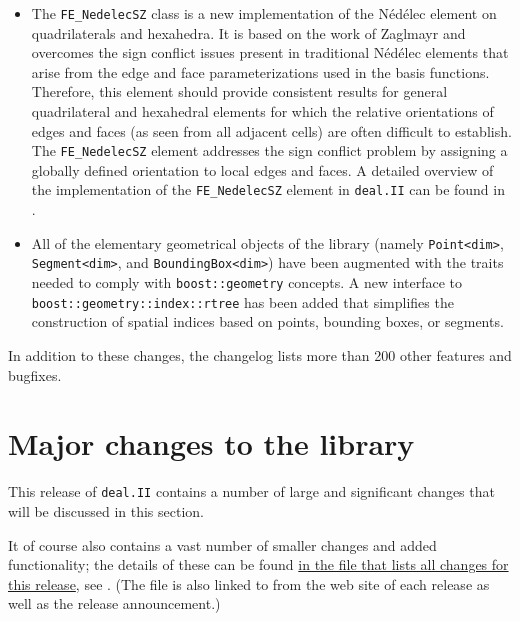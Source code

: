 \documentclass{ansarticle-preprint}
\newcommand{\specialword}[1]{\texttt{#1}}
\newcommand{\dealii}{{\specialword{deal.II}}\xspace}
\begin{document}
\begin{itemize}
\item
  The \texttt{FE\_NedelecSZ} class is a new implementation of the
  N{\'e}d{\'e}lec element on quadrilaterals and hexahedra. It is based on
  the work of Zaglmayr \cite{Zag06} and overcomes the sign conflict issues
  present in traditional N{\'e}d{\'e}lec elements that arise from the edge
  and face parameterizations used in the basis functions. Therefore, this
  element should provide consistent results for general quadrilateral and
  hexahedral elements for which the relative orientations of edges and
  faces (as seen from all adjacent cells) are often difficult to establish.
  The \texttt{FE\_NedelecSZ} element addresses the sign conflict problem by
  assigning a globally defined orientation to local edges and faces. A
  detailed overview of the implementation of the \texttt{FE\_NedelecSZ}
  element in \dealii{} can be found in \cite{Kynch2017}.

\item All of the elementary geometrical objects of the library (namely
  \texttt{Point<dim>}, \texttt{Segment<dim>}, and
  \texttt{BoundingBox<dim>}) have been augmented with the traits
  needed to comply with \texttt{boost::geometry} concepts. A new
  interface to \texttt{boost::geometry::index::rtree} has been added
  that simplifies the construction of spatial indices based on points,
  bounding boxes, or segments.
\end{itemize}
%
In addition to these changes, the changelog lists more than 200 other
features and bugfixes.




\section{Major changes to the library}
\label{sec:major}

This release of \dealii contains a number of large and significant changes
that will be discussed in this section.

It of course also contains a
vast number of smaller changes and added functionality; the details of these
can be found
\href{https://dealii.org/developer/doxygen/deal.II/changes_between_9_0_1_and_9_1_0.html}{
in the file that lists all changes for this release}, see \cite{changes91}.
(The file is also linked to from the web site of each release as well as
the release announcement.)
\end{document}
